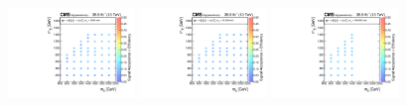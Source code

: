 \begin{figure}
\begin{center}
            \includegraphics[width=0.30\textwidth]{Supplementary/T1qqqqLL_ctau_1000_efficiency_aux}
            \includegraphics[width=0.30\textwidth]{Supplementary/T1qqqqLL_ctau_10000_efficiency_aux}
            \includegraphics[width=0.30\textwidth]{Supplementary/T1qqqqLL_ctau_100000_efficiency_aux}


\end{center}
\end{figure}
